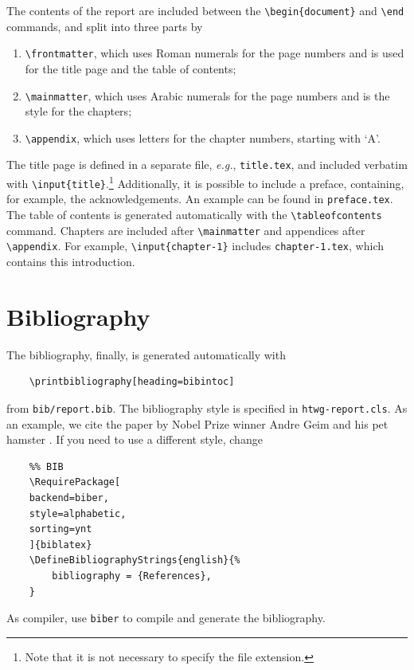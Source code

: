 The contents of the report are included between the \texttt{\textbackslash begin\{document\}} and \texttt{\textbackslash end} commands, and split into three parts by
\begin{enumerate}
	\item\texttt{\textbackslash frontmatter}, which uses Roman numerals for the page numbers and is used for the title page and the table of contents;
	\item\texttt{\textbackslash mainmatter}, which uses Arabic numerals for the page numbers and is the style for the chapters;
	\item\texttt{\textbackslash appendix}, which uses letters for the chapter numbers, starting with `A'.
\end{enumerate}
The title page is defined in a separate file, \emph{e.g.}, \texttt{title.tex}, and included verbatim with \texttt{\textbackslash input\{title\}}.\footnote{Note that it is not necessary to specify the file extension.} Additionally, it is possible to include a preface, containing, for example, the acknowledgements. An example can be found in \texttt{preface.tex}. The table of contents is generated automatically with the \texttt{\textbackslash tableofcontents} command. Chapters are included after \texttt{\textbackslash mainmatter} and appendices after \texttt{\textbackslash appendix}. For example, \texttt{\textbackslash input\{chapter-1\}} includes \texttt{chapter-1.tex}, which contains this introduction.

\section{Bibliography}

The bibliography, finally, is generated automatically with
\begin{lstlisting}
	\printbibliography[heading=bibintoc]
\end{lstlisting}
from \texttt{bib/report.bib}. The bibliography style is specified in \texttt{htwg-report.cls}. As an example, we cite the paper by Nobel Prize winner Andre Geim and his pet hamster \cite{Geim2001}. If you need to use a different style, change

\begin{lstlisting}
	%% BIB
	\RequirePackage[
	backend=biber,
	style=alphabetic,
	sorting=ynt
	]{biblatex}
	\DefineBibliographyStrings{english}{%
		bibliography = {References},
	}
\end{lstlisting}

As compiler, use \texttt{biber} to compile and generate the bibliography.

